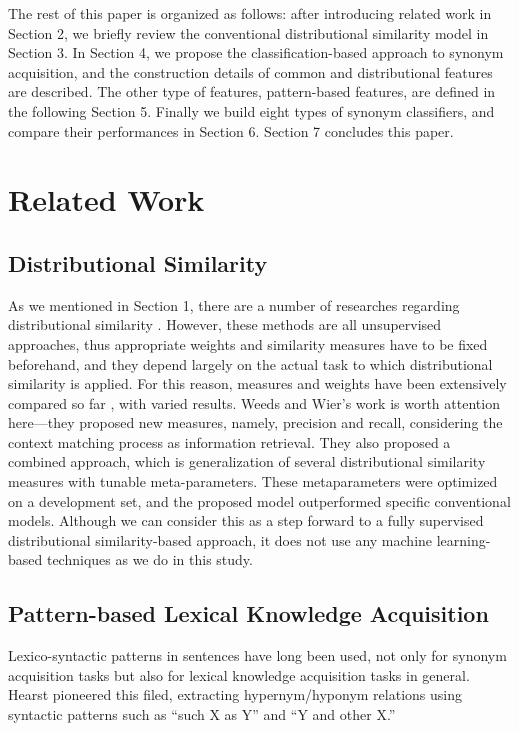 \documentclass[english]{jnlp_1.4}
\begin{document}
The rest of this paper is organized as follows: after introducing
related work in Section 2, we briefly review the conventional
distributional similarity model in Section 3. In Section 4, we propose
the classification-based approach to synonym acquisition, and the
construction details of common and distributional features are
described. The other type of features, pattern-based features, are
defined in the following Section 5. Finally we build eight types of
synonym classifiers, and compare their performances in Section
6. Section 7 concludes this paper.



\section{Related Work}

\subsection{Distributional Similarity}

As we mentioned in Section 1, there are a number of researches
regarding distributional similarity
\cite{Hindle:90,Lin:98:automatic,Geffet:04}. However, these methods
are all unsupervised approaches, thus appropriate weights and
similarity measures have to be fixed beforehand, and they depend
largely on the actual task to which distributional similarity is
applied. For this reason, measures and weights have been extensively
compared so far \cite{Lee:99,Curran:02:improvements,Weeds:04}, with
varied results.  Weeds and Wier's work \cite{Weeds:03} is worth
attention here---they proposed new measures, namely, precision and
recall, considering the context matching process as information
retrieval. They also proposed a combined approach, which is
generalization of several distributional similarity measures with
tunable meta-parameters. These metaparameters were optimized on a
development set, and the proposed model outperformed specific
conventional models. Although we can consider this as a step forward
to a fully supervised distributional similarity-based approach, it
does not use any machine learning-based techniques as we do in this
study.


\subsection{Pattern-based Lexical Knowledge Acquisition}

Lexico-syntactic patterns in sentences have long been used, not only
for synonym acquisition tasks but also for lexical knowledge
acquisition tasks in general. Hearst \cite{Hearst:92} pioneered this
filed, extracting hypernym/hyponym relations using syntactic patterns
such as ``such X as Y'' and ``Y and other X.''
\end{document}
